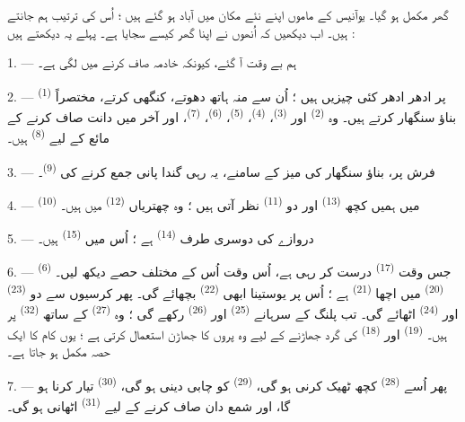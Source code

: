 گھر مکمل ہو گیا۔ یوآنیس کے ماموں اپنے نئے مکان میں آباد ہو گئے ہیں ؛
اُس کی ترتیب ہم جانتے ہیں۔ اب دیکھیں کہ اُنھوں نے اپنا گھر کیسے سجایا
ہے۔ پہلے یہ دیکھتے ہیں :

\VUsaut{3.0mm}

1. --- ہم بے وقت آ گئے، کیونکہ خادمہ  صاف کرنے میں لگی
ہے۔

2. ---  \textsuperscript{(1)} پر ادھر ادھر
کئی چیزیں ہیں ؛ اُن سے منہ ہاتھ دھوتے، کنگھی کرتے، مختصراً بناؤ
سنگھار کرتے ہیں۔ وہ  \textsuperscript{(2)} اور
 \textsuperscript{(3)}، 
\textsuperscript{(4)}،  \textsuperscript{(5)}،
 \textsuperscript{(6)}، 
\textsuperscript{(7)}، اور آخر میں دانت صاف کرنے کے مائع کے لیے
 \textsuperscript{(8)} ہیں۔

3. --- فرش پر، بناؤ سنگھار کی میز کے سامنے، یہ رہی گندا پانی جمع کرنے
کی  \textsuperscript{(9)}۔

4. ---  \textsuperscript{(10)} میں ہمیں کچھ
 \textsuperscript{(13)} اور دو
 \textsuperscript{(11)} نظر آتی ہیں ؛ وہ چھتریاں
 \textsuperscript{(12)} میں ہیں۔

5. --- دروازے کی دوسری طرف 
\textsuperscript{(14)} ہے ؛ اُس میں  \textsuperscript{(15)}
ہیں۔

6. ---  \textsuperscript{(6)} جس وقت 
\textsuperscript{(17)} درست کر رہی ہے، اُس وقت اُس کے مختلف حصے دیکھ
لیں۔  \textsuperscript{(20)} میں اچھا
 \textsuperscript{(21)} ہے ؛ اُس پر یوستینا ابھی
 \textsuperscript{(22)} بچھائے گی۔ پھر کرسیوں سے دو
 \textsuperscript{(23)} اور 
\textsuperscript{(24)} اٹھائے گی۔ تب پلنگ کے سرہانے
 \textsuperscript{(25)} اور 
\textsuperscript{(26)} رکھے گی ؛ وہ 
\textsuperscript{(27)} کے ساتھ  \textsuperscript{(32)}
پر ہیں۔  \textsuperscript{(19)} اور  \textsuperscript{(18)} کی گرد جھاڑنے کے لیے وہ پروں کا جھاڑن
استعمال کرتی ہے ؛ یوں کام کا ایک حصہ مکمل ہو جاتا ہے۔

7. --- پھر اُسے  \textsuperscript{(28)}
کچھ ٹھیک کرنی ہو گی،  \textsuperscript{(29)}
کو چابی دینی ہو گی،  \textsuperscript{(30)} تیار
کرنا ہو گا، اور شمع دان صاف کرنے کے لیے 
\textsuperscript{(31)} اٹھانی ہو گی۔

